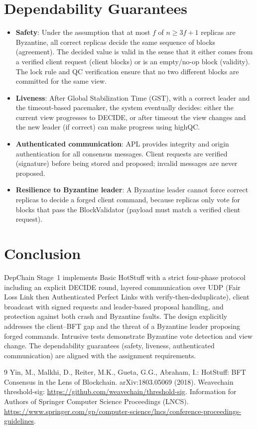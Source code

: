 \documentclass{llncs}
\begin{document}
\section{Dependability Guarantees}
\vspace{-0.5em}
\begin{itemize}
  \setlength{\itemsep}{1pt}\setlength{\parsep}{0pt}\setlength{\topsep}{2pt}
  \item \textbf{Safety}: Under the assumption that at most $f$ of $n \ge 3f+1$ replicas are Byzantine, all correct replicas decide the same sequence of blocks (agreement). The decided value is valid in the sense that it either comes from a verified client request (client blocks) or is an empty/no-op block (validity). The lock rule and QC verification ensure that no two different blocks are committed for the same view.
  \item \textbf{Liveness}: After Global Stabilization Time (GST), with a correct leader and the timeout-based pacemaker, the system eventually decides: either the current view progresses to DECIDE, or after timeout the view changes and the new leader (if correct) can make progress using highQC.
  \item \textbf{Authenticated communication}: APL provides integrity and origin authentication for all consensus messages. Client requests are verified (signature) before being stored and proposed; invalid messages are never proposed.
  \item \textbf{Resilience to Byzantine leader}: A Byzantine leader cannot force correct replicas to decide a forged client command, because replicas only vote for blocks that pass the BlockValidator (payload must match a verified client request).
\end{itemize}

\section{Conclusion}
\vspace{-0.5em}
DepChain Stage~1 implements Basic HotStuff with a strict four-phase protocol including an explicit DECIDE round, layered communication over UDP (Fair Loss Link then Authenticated Perfect Links with verify-then-deduplicate), client broadcast with signed requests and leader-based proposal handling, and protection against both crash and Byzantine faults. The design explicitly addresses the client--BFT gap and the threat of a Byzantine leader proposing forged commands. Intrusive tests demonstrate Byzantine vote detection and view change. The dependability guarantees (safety, liveness, authenticated communication) are aligned with the assignment requirements.

\begin{thebibliography}{9}
 Yin, M., Malkhi, D., Reiter, M.K., Gueta, G.G., Abraham, I.: HotStuff: BFT Consensus in the Lens of Blockchain. arXiv:1803.05069 (2018).
 Weavechain threshold-sig: \url{https://github.com/weavechain/threshold-sig}.
 Information for Authors of Springer Computer Science Proceedings (LNCS). \url{https://www.springer.com/gp/computer-science/lncs/conference-proceedings-guidelines}.
\end{thebibliography}
\end{document}
